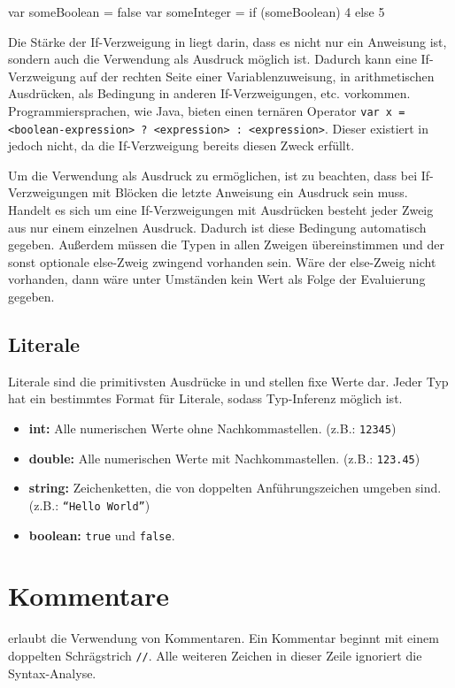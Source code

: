\begin{ToyaCode}[numbers=none, caption={If-Verzweigung als Ausdruck in einer Variablenzuweisung.}, label=lst:intro_ifexpression]
var someBoolean = false
var someInteger = if (someBoolean) 4 else 5
\end{ToyaCode}

Die Stärke der If-Verzweigung in \toya liegt darin, dass es nicht nur ein Anweisung ist, sondern auch die Verwendung als Ausdruck möglich ist. Dadurch kann eine If-Verzweigung auf der rechten Seite einer Variablenzuweisung, in arithmetischen Ausdrücken, als Bedingung in anderen If-Verzweigungen, etc. vorkommen. Programmiersprachen, wie Java, bieten einen ternären Operator \texttt{var x = <boolean-expression> ? <expression> : <expression>}. Dieser existiert in \toya jedoch nicht, da die If-Verzweigung bereits diesen Zweck erfüllt. 

Um die Verwendung als Ausdruck zu ermöglichen, ist zu beachten, dass bei If-Verzweigungen mit Blöcken die letzte Anweisung ein Ausdruck sein muss. Handelt es sich um eine If-Verzweigungen mit Ausdrücken besteht jeder Zweig aus nur einem einzelnen Ausdruck. Dadurch ist diese Bedingung automatisch gegeben. Außerdem müssen die Typen in allen Zweigen übereinstimmen und der sonst optionale else-Zweig zwingend vorhanden sein. Wäre der else-Zweig nicht vorhanden, dann wäre unter Umständen kein Wert als Folge der Evaluierung gegeben.

\subsection{Literale}

Literale sind die primitivsten Ausdrücke in \toya und stellen fixe Werte dar. Jeder Typ hat ein bestimmtes Format für Literale, sodass Typ-Inferenz möglich ist. 

\begin{itemize}
    \item \textbf{int:} Alle numerischen Werte ohne Nachkommastellen. (z.B.: \texttt{12345})
    \item \textbf{double:} Alle numerischen Werte mit Nachkommastellen. (z.B.: \texttt{123.45})
    \item \textbf{string:} Zeichenketten, die von doppelten Anführungszeichen umgeben sind. (z.B.: \texttt{``Hello World''})
    \item \textbf{boolean:} \texttt{true} und \texttt{false}. 
\end{itemize}

\section{Kommentare}

\toya erlaubt die Verwendung von Kommentaren. Ein Kommentar beginnt mit einem doppelten Schrägstrich \texttt{//}. Alle weiteren Zeichen in dieser Zeile ignoriert die Syntax-Analyse.